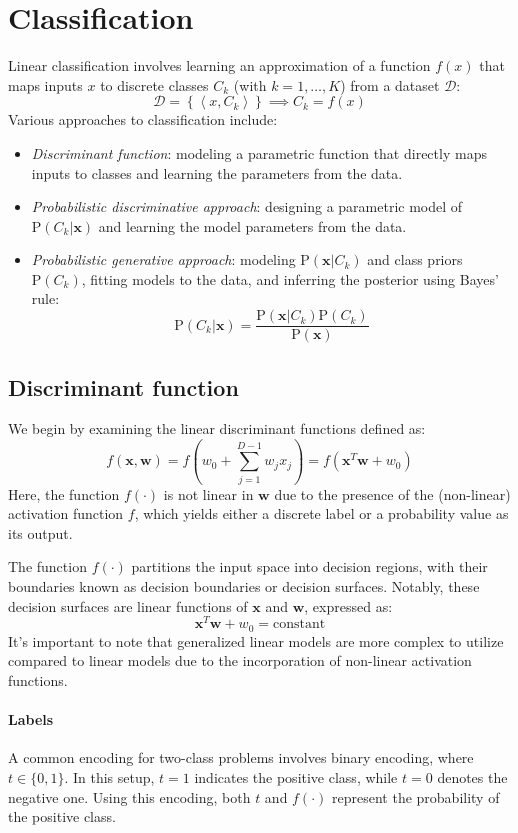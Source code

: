 \section{Classification}

Linear classification involves learning an approximation of a function $f(x)$ that maps inputs $x$  to discrete classes $C_k$ (with $k=1,\dots,K$) from a dataset $\mathcal{D}$: 
\[\mathcal{D}=\left\{ \left\langle x,C_k \right\rangle \right\} \implies C_k=f(x)\]
Various approaches to classification include:
\begin{itemize}
    \item \textit{Discriminant function}: modeling a parametric function that directly maps inputs to classes and learning the parameters from the data.
    \item \textit{Probabilistic discriminative approach}: designing a parametric model of $\text{P}(C_k|\textbf{x})$ and learning the model parameters from the data.
    \item \textit{Probabilistic generative approach}: modeling $\text{P}(\textbf{x}|C_k)$ and class priors $\text{P}(C_k)$, fitting models to the data, and inferring the posterior using Bayes' rule:
        \[\text{P}(C_k|\textbf{x})=\dfrac{\text{P}(\textbf{x}|C_k)\text{P}(C_k)}{\text{P}(\textbf{x})}\]
\end{itemize}

\subsection{Discriminant function}
We begin by examining the linear discriminant functions defined as:
\[f(\textbf{x},\textbf{w})=f\left( w_0+\sum_{j=1}^{D-1}w_j x_j \right)=f(\textbf{x}^T\textbf{w}+w_0)\]
Here, the function $f(\cdot)$ is not linear in $\textbf{w}$ due to the presence of the (non-linear) activation function $f$, which yields either a discrete label or a probability value as its output.

The function $f(\cdot)$ partitions the input space into decision regions, with their boundaries known as decision boundaries or decision surfaces.
Notably, these decision surfaces are linear functions of $\textbf{x}$ and $\textbf{w}$, expressed as:
\[\textbf{x}^T\textbf{w}+w_0=\text{constant}\]
It's important to note that generalized linear models are more complex to utilize compared to linear models due to the incorporation of non-linear activation functions.

\paragraph*{Labels}
A common encoding for two-class problems involves binary encoding, where $t \in \{0,1\}$. 
In this setup, $t=1$ indicates the positive class, while $t=0$ denotes the negative one.
Using this encoding, both $t$ and $f(\cdot)$ represent the probability of the positive class.

